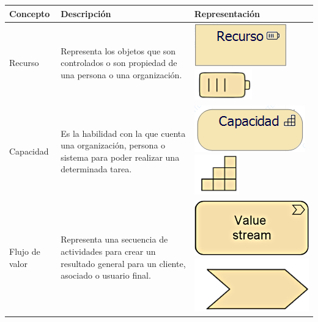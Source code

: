 \begin{table}[h!]
	\begin{center}
		\begin{tabular}{| l | p{6cm} | p{4cm} |} %
			\hline
			Concepto & Descripción & Representación \\ \hline
			
			Recurso
			& 
			Representa los objetos que son controlados o son 
			propiedad de una persona o una organización. 
			& 
			\vspace{0,2mm}	\includegraphics[scale=0.62]{imgs/conceptos/estrategia/Recurso.PNG}	\includegraphics[scale=1.6]{imgs/conceptos/estrategia/imgRecurso.PNG}\\ \hline
			Capacidad 
			& 
			Es la habilidad con la que cuenta una organización, persona o sistema para poder realizar una determinada tarea.
			& \vspace{0,2mm}\includegraphics[scale=0.6]{imgs/conceptos/estrategia/Capacidad.PNG}
			\includegraphics[scale=1.6]{imgs/conceptos/estrategia/imgCapacidad.PNG}
			\\ \hline
			
			Flujo de valor 
			& 
			Representa una secuencia de actividades para crear un resultado general para un cliente, asociado o usuario final.
			& 
			\vspace{0,2mm} \includegraphics[scale=1]{imgs/conceptos/estrategia/FlujoValor1.png}
			\includegraphics[scale=0.8]{imgs/conceptos/estrategia/FlujoValor2.png}
			\\ \hline
			

\end{tabular}
\end{center}
\end{table}
